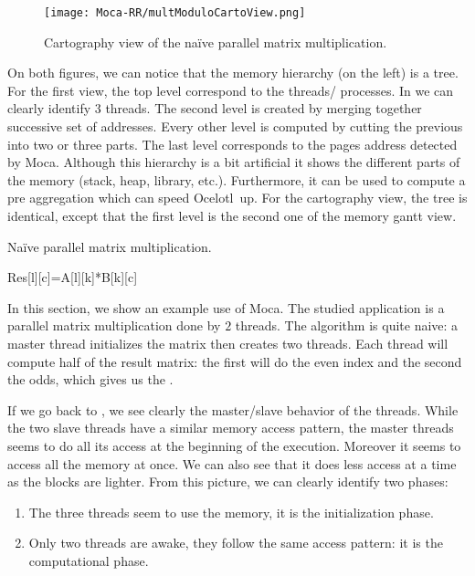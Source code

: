 \begin{figure}[htb]
    \centering
    \texttt{[image: Moca-RR/multModuloCartoView.png]}
    \caption{Cartography view of the naïve parallel matrix multiplication.}
    \label{fig:ocelotl-carto0}
\end{figure}

On both figures, we can notice that the memory hierarchy (on the left) is a tree.
For the first view, the top level correspond to the threads/ processes.
In  we can clearly identify $3$ threads.
The second level is created by merging together successive set of addresses.
Every other level is computed by cutting the previous into two or three parts.
The last level corresponds to the pages address detected by \gls{Moca}.
 Although this hierarchy is a bit artificial it shows the different parts of the memory (stack, heap, library, etc.).
Furthermore, it can be used to compute a pre aggregation which can speed \gls{Ocelotl}~up.
For the cartography view, the tree is identical, except that the first level is the second one of the memory gantt view.

\begin{algorithm}
    \caption{Naïve parallel matrix multiplication.}
    \label{alg:mat-par}
    \begin{algorithmic}
                \State Res[l][c]=A[l][k]*B[k][c]
                \EndFor
            \EndFor
        \EndFor
    \end{algorithmic}
\end{algorithm}

In this section, we show an example use of \gls{Moca}.
The studied application is a parallel matrix multiplication done by $2$ threads.
The algorithm is quite naive: a master thread initializes the matrix then creates two threads.
Each thread will compute half of the result matrix: the first will do the even index and the second the odds, which gives us the .


If we go back to , we see clearly the master/slave behavior of the threads.
While the two slave threads have a similar memory access pattern, the master threads seems to do all its access at the beginning of the execution.
Moreover it seems to access all the memory at once.
We can also see that it does less access at a time as the blocks are lighter.
From this picture, we can clearly identify two phases:
\begin{enumerate}
    \item The three threads seem to use the memory, it is the initialization phase.
    \item Only two threads are awake, they follow the same access pattern: it
        is the computational phase.
\end{enumerate}

